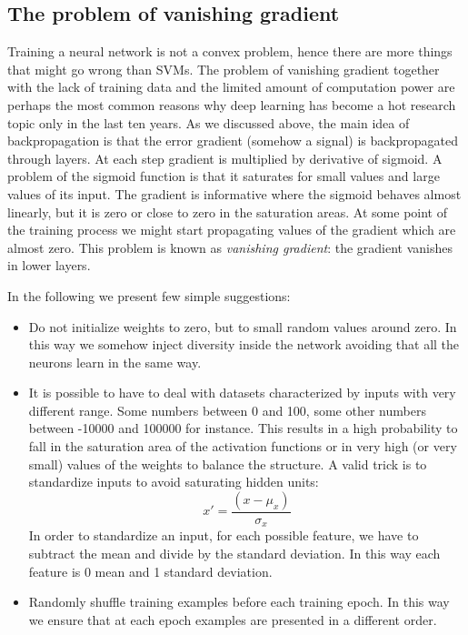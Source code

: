 \subsection{The problem of vanishing gradient}
Training a neural network is not a convex problem, hence there are more things that
might go wrong than SVMs. The problem of vanishing gradient together with the
lack of training data and the limited amount of computation power are perhaps
the most common reasons why deep learning has become a hot research topic only
in the last ten years. As we discussed above, the main idea of backpropagation
is that the error gradient (somehow a signal) is backpropagated through layers. At
each step gradient is multiplied by derivative of sigmoid. A problem of the
sigmoid function is that it saturates for small values and large values of its
input. The gradient is informative where the sigmoid behaves almost linearly,
but it is zero or close to zero in the saturation areas. At some point of the training
process we might start propagating values of the gradient which are almost zero.
This problem is known as \textit{vanishing gradient}: the gradient vanishes in
lower layers.
\newline

In the following we present few simple suggestions:
\begin{itemize}
	\item Do not initialize weights to zero, but to small random values around
		zero. In this way we somehow inject diversity inside the network avoiding that
		all the neurons learn in the same way.

	\item It is possible to have to deal with datasets characterized by inputs with
		very different range. Some numbers between 0 and 100, some other numbers between
		-10000 and 100000 for instance. This results in a high probability to fall in
		the saturation area of the activation functions or in very high (or very
		small) values of the weights to balance the structure. A valid trick is to
		standardize inputs to avoid saturating hidden units:
		\[
			x' = \frac{(x - \mu_{x})}{\sigma_{x}}
		\]
		In order to standardize an input, for each possible feature, we have to subtract
		the mean and divide by the standard deviation. In this way each feature is 0
		mean and 1 standard deviation.

	\item Randomly shuffle training examples before each training epoch. In this
		way we ensure that at each epoch examples are presented in a different order.
\end{itemize}

